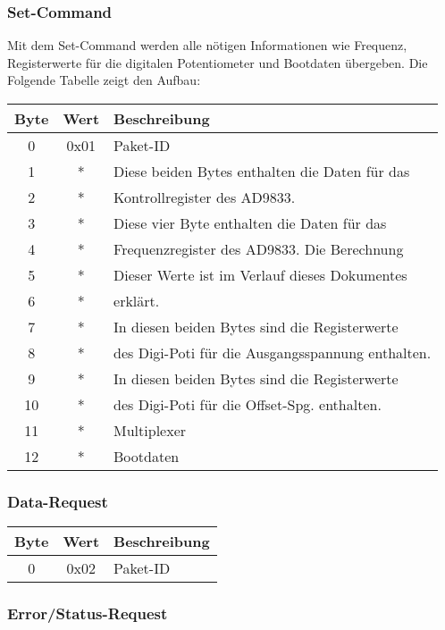 \documentclass[a4paper,12pt]{article}
\begin{document}
\subsubsection{Set-Command}
Mit dem Set-Command werden alle nötigen Informationen wie Frequenz, Registerwerte für die digitalen Potentiometer und Bootdaten übergeben. Die Folgende Tabelle zeigt den Aufbau:
\linebreak

\begin{flushleft}
\begin{tabular}{c||c|l}
Byte & Wert & Beschreibung \\
\hline
\hline
0 & 0x01 & Paket-ID \\
\hline
1 & * & Diese beiden Bytes enthalten die Daten für das \\
2 & * & Kontrollregister des AD9833.\\
\hline
3 & * & Diese vier Byte enthalten die Daten für das \\
4 & * & Frequenzregister des AD9833. Die Berechnung \\
5 & * & Dieser Werte ist im Verlauf dieses Dokumentes \\
6 & * & erklärt.\\
\hline
7 & * & In diesen beiden Bytes sind die Registerwerte \\
8 & * & des Digi-Poti für die Ausgangsspannung enthalten.\\
\hline
9 & * & In diesen beiden Bytes sind die Registerwerte \\
10 & * & des Digi-Poti für die Offset-Spg. enthalten.\\
\hline
11 & * & Multiplexer\\
\hline
12 & * & Bootdaten\\

\end{tabular}
\end{flushleft}

\subsubsection{Data-Request}

\begin{tabular}{c||c|l}
Byte & Wert & Beschreibung \\
\hline
\hline
0 & 0x02 & Paket-ID \\

\end{tabular}

\subsubsection{Error/Status-Request}
\end{document}
